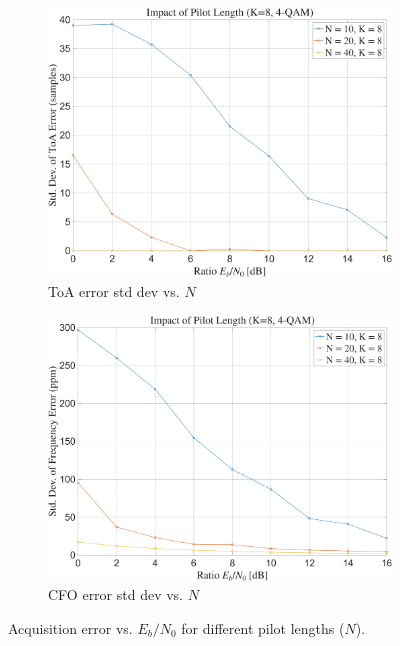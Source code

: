 \documentclass[11pt]{article}
\begin{document}
	\begin{figure}[H]
		\centering
		\begin{subfigure}[b]{0.4\textwidth}
			\includegraphics[width=\linewidth]{Images/frame_sync_pilot_len.png} 
			\caption{ToA error std dev vs. $N$}
		\end{subfigure}
		\hfill
		\begin{subfigure}[b]{0.4\textwidth}
			\includegraphics[width=\linewidth]{Images/cfo_est_pilot_len.png} 
			\caption{CFO error std dev vs. $N$}
		\end{subfigure}
		\caption{Acquisition error vs. $E_b/N_0$ for different pilot lengths ($N$).}
		\label{fig:acquisition_vs_pilot_len_compact}
	\end{figure}
			
\end{document}
